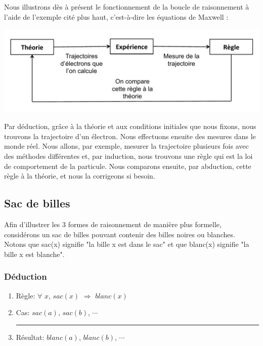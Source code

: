 Nous illustrons dès à présent le fonctionnement de la boucle de raisonnement à l'aide de l'exemple cité plus haut, c'est-à-dire les équations de Maxwell :

\begin{center}
\includegraphics[scale=0.50]{images/BoucleRaisonnement2.pdf}
\end{center}

Par déduction, grâce à la théorie et aux conditions initiales que nous fixons, nous trouvons la trajectoire d'un électron. Nous effectuons ensuite des mesures dans le monde réel. Nous allons, par exemple, mesurer la trajectoire plusieurs fois avec des méthodes différentes et, par induction, nous trouvons une règle qui est la loi de comportement de la particule. Nous comparons ensuite, par abduction, cette règle à la théorie, et nous la corrigeons si besoin.\\



\subsection{Sac de billes}

Afin d'illustrer les 3 formes de raisonnement de manière plus formelle, considérons un sac de billes pouvant contenir des billes noires ou blanches. Notons que sac(x) signifie "la bille x est dans le sac" et que blanc(x) signifie "la bille x est blanche". \\

\subsubsection{Déduction}

\begin{enumerate}
  \item Règle: $\forall$ $x$, $sac(x)$ $\Rightarrow$ $blanc(x)$
  \item Cas: $sac(a)$, $sac(b)$, $\cdots$\\
  \rule{5.5cm}{.1pt} 
  \item Résultat: $blanc(a)$, $blanc(b)$, $\cdots$
\end{enumerate}

